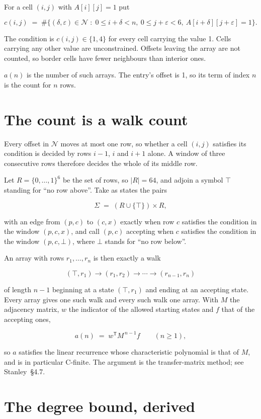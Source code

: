 \documentclass[11pt]{article}
\theoremstyle{definition}
\begin{document}
For a cell $(i,j)$ with $A[i][j] = 1$ put

\[c(i,j) \;=\; \#\bigl\{(\delta,\varepsilon)\in\mathcal{N} \;:\; 0\le i+\delta<n,\ 0\le j+\varepsilon<6,\ A[i+\delta][j+\varepsilon] = 1\bigr\}.\]

The condition is $c(i,j) \in \{1, 4\}$ for every cell carrying the value 1. Cells carrying any other value are unconstrained. Offsets leaving the array are not counted, so border cells have fewer neighbours than interior ones.

$a(n)$ is the number of such arrays. The entry's offset is 1, so its term of index $n$ is the count for $n$ rows.

\section{The count is a walk count}

Every offset in $\mathcal{N}$ moves at most one row, so whether a cell $(i,j)$ satisfies its condition is decided by rows $i-1$, $i$ and $i+1$ alone. A window of three consecutive rows therefore decides the whole of its middle row.

Let $R = \{0,\dots,1\}^{6}$ be the set of rows, so $|R| = 64$, and adjoin a symbol $\top$ standing for ``no row above''. Take as states the pairs

\[\Sigma \;=\; (R \cup \{\top\}) \times R,\]

with an edge from $(p,c)$ to $(c,x)$ exactly when row $c$ satisfies the condition in the window $(p,c,x)$, and call $(p,c)$ accepting when $c$ satisfies the condition in the window $(p,c,\bot)$, where $\bot$ stands for ``no row below''.

An array with rows $r_1,\dots,r_n$ is then exactly a walk

\[(\top,r_1) \to (r_1,r_2) \to \cdots \to (r_{n-1},r_n)\]

of length $n-1$ beginning at a state $(\top,r_1)$ and ending at an accepting state. Every array gives one such walk and every such walk one array. With $M$ the adjacency matrix, $w$ the indicator of the allowed starting states and $f$ that of the accepting ones,

\[a(n) \;=\; w^{\mathsf T} M^{\,n-1} f \qquad (n \ge 1),\]

so $a$ satisfies the linear recurrence whose characteristic polynomial is that of $M$, and is in particular C-finite. The argument is the transfer-matrix method; see Stanley~\S4.7.

\section{The degree bound, derived}
\end{document}
